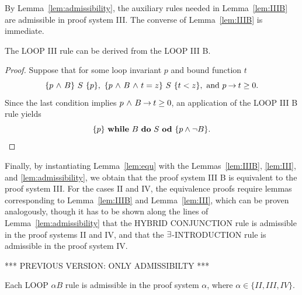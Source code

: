 \documentclass[manuscript, screen, review]{acmart}
\begin{document}
By Lemma~\ref{lem:admissibility}, the auxiliary rules needed in Lemma~\ref{lem:IIIB}
are admissible in proof system III. The converse of Lemma~\ref{lem:IIIB}
is immediate.

\begin{lemma}\label{lem:III}
  The {\rm LOOP III} rule can be derived from the {\rm LOOP III B}. 
\end{lemma}

\begin{proof}
Suppose that for some loop invariant $p$ and bound function $t$
\[
\mbox{$\{{p \mbox{$\ \wedge\ $} B}\}\ {S}\ \{{p}\}$}, \
\mbox{$\{{p \mbox{$\ \wedge\ $} B \mbox{$\ \wedge\ $} t=z}\}\ {S}\ \{{t<z}\}$}, \mbox{  and }  p \mbox{$\:\rightarrow\:$} t \geq 0.
\]
Since the last condition implies $p \mbox{$\ \wedge\ $} B \mbox{$\:\rightarrow\:$} t \geq 0$,
an application of the LOOP III B rule yields
\[
 \mbox{$\{{p}\}\ {\mbox{$\mbox{{\bf while}\ } {B}\ \mbox{{\bf do}\ } {S}\ \mbox{{\bf od}}$}}\ \{{p \wedge \neg B}\}$}.
\]
\end{proof}

Finally, by instantiating Lemma~\ref{lem:equ} with the 
Lemmas~\ref{lem:IIIB}, \ref{lem:III}, and \ref{lem:admissibility}, 
we obtain that the proof system III B is equivalent to the proof system III.
For the cases II and IV, the equivalence proofs require
lemmas corresponding to Lemma~\ref{lem:IIIB} and Lemma~\ref{lem:III},
which can be proven analogously,
though it has to be shown along the lines of Lemma~\ref{lem:admissibility}
that the HYBRID CONJUNCTION rule is admissible in the proof systems II and IV,
and that the $\mbox{$\exists$}$-INTRODUCTION rule is admissible in the proof system IV.




\III

*** PREVIOUS VERSION: ONLY ADMISSIBILTY ***

\begin{theorem}
  Each LOOP $\alpha B$ rule is admissible in the proof system
  $\alpha$, where $\alpha \in \{II, III, IV\}$.
\end{theorem}
\end{document}
